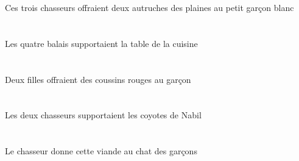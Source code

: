 \begin{exe}
Ces trois chasseurs offraient deux autruches des plaines au petit garçon blanc
\ex\glll
\DEFPlErg{}   \quatreCPl{}   \balaiCPlErg{}   \DEFSgAbs{}    \DEFSgObl{}   \cuisineCSgObl{}   \DE{}   \tableCSgAbs{}  \supporterVtPstCSg{}\\
\DEFPlErgP{}   \quatreCPlP{}   \balaiCPlErgP{}   \DEFSgAbsP{}    \DEFSgOblP{}   \cuisineCSgOblP{}   \DEP{}   \tableCSgAbsP{}  \supporterVtPstCSgP{}\\
\DEFPlErgG{}   \quatreCPlG{}   \balaiCPlErgG{}   \DEFSgAbsG{}    \DEFSgOblG{}   \cuisineCSgOblG{}   \DEG{}   \tableCSgAbsG{}  \supporterVtPstCSgG{}\\
Les quatre balais supportaient la table de la cuisine
\ex\glll
\INDDuErg{}   \filleCDuErg{}    \DEFSgDat{}   \garconBSgDat{}   \INDPlAbs{}   \rougeAPl{}   \coussinAPlAbs{}  \offrirVdPstAPl{}\\
\INDDuErgP{}   \filleCDuErgP{}    \DEFSgDatP{}   \garconBSgDatP{}   \INDPlAbsP{}   \rougeAPlP{}   \coussinAPlAbsP{}  \offrirVdPstAPlP{}\\
\INDDuErgG{}   \filleCDuErgG{}    \DEFSgDatG{}   \garconBSgDatG{}   \INDPlAbsG{}   \rougeAPlG{}   \coussinAPlAbsG{}  \offrirVdPstAPlG{}\\
Deux filles offraient des coussins rouges au garçon
\ex\glll
\DEFDuErg{}   \chasseurCDuErg{}   \DEFPlAbs{}    \INDSgObl{}   \NabilBSgObl{}   \DE{}   \coyoteAPlAbs{}  \supporterVtPstAPl{}\\
\DEFDuErgP{}   \chasseurCDuErgP{}   \DEFPlAbsP{}    \INDSgOblP{}   \NabilBSgOblP{}   \DEP{}   \coyoteAPlAbsP{}  \supporterVtPstAPlP{}\\
\DEFDuErgG{}   \chasseurCDuErgG{}   \DEFPlAbsG{}    \INDSgOblG{}   \NabilBSgOblG{}   \DEG{}   \coyoteAPlAbsG{}  \supporterVtPstAPlG{}\\
Les deux chasseurs supportaient les coyotes de Nabil
\ex\glll
\DEFSgErg{}   \chasseurCSgErg{}    \DEFSgDat{}    \DEFPlObl{}   \garconBPlObl{}   \DE{}   \chatDSgDat{}   \DEMSgAbs{}   \viandeASgAbs{}  \donnerVdPrsASg{}\\
\DEFSgErgP{}   \chasseurCSgErgP{}    \DEFSgDatP{}    \DEFPlOblP{}   \garconBPlOblP{}   \DEP{}   \chatDSgDatP{}   \DEMSgAbsP{}   \viandeASgAbsP{}  \donnerVdPrsASgP{}\\
\DEFSgErgG{}   \chasseurCSgErgG{}    \DEFSgDatG{}    \DEFPlOblG{}   \garconBPlOblG{}   \DEG{}   \chatDSgDatG{}   \DEMSgAbsG{}   \viandeASgAbsG{}  \donnerVdPrsASgG{}\\
Le chasseur donne cette viande au chat des garçons
\ex\glll
\INDSgAbs{}   \sourisASgAbs{}    \DEFSgObl{}    \INDSgObl{}   \KatishaASgObl{}   \DE{}   \litDSgObl{}   \DANS{}  \arriverViPrsASg{}\\

\end{exe}
